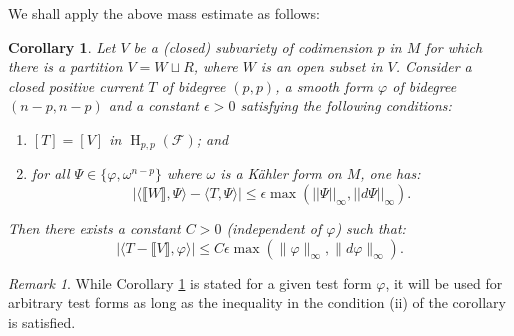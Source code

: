 \documentclass[12pt]{amsbook}%
\newtheorem{cor}[thm]{Corollary}
\theoremstyle{definition}
\theoremstyle{remark}
\newtheorem{rem}[thm]{Remark}
\numberwithin{section}{chapter}
\numberwithin{subsection}{section}
\numberwithin{figure}{chapter}
\DeclareMathOperator{\coh}{H}
\def\kap{}
\begin{document}
{{We shall apply  the above mass estimate as follows:
 
\begin{cor} \label{cor_difference_current}
Let $V$ be a (closed) subvariety of codimension $p$ in $M$ for which there is a partition $V = W\sqcup R$, 
where $W$ is an open subset in $V$. Consider a closed positive current $T$ of bidegree $(p,p)$, a smooth form $\varphi$ of bidegree $(n-p,n-p)$ and a constant $\epsilon>0$  satisfying the following conditions:
\begin{enumerate}
\item[(i)] $[T] = [V]$ in $\coh_{p,p}(\mathcal{F})$; and 
\item[(ii)] 
 for all $\Psi  \in \{ \varphi , \omega^{n-p}\}$  where $\omega$ is a K\"ahler form on $M$, one has: 
$$ \left | \langle \llbracket W\rrbracket, \Psi \rangle - \langle T, \Psi \rangle \right | \leqslant  \epsilon \max (||\Psi||_\infty, ||d\Psi||_\infty ). $$
\end{enumerate} 
Then there exists a constant $C> 0$ (independent of $\varphi$) such that:
\begin{equation*}
| \langle T -   \llbracket V\rrbracket, \varphi  \rangle | \leqslant C\epsilon \max (\lVert\varphi\rVert_\infty, \lVert d\varphi\rVert_\infty ). 
\end{equation*}
\end{cor} 


\begin{rem} While Corollary \ref{cor_difference_current} is stated for a given test form $\varphi$, it will be used for arbitrary test forms as long as the inequality in the condition (ii) of the corollary  is satisfied. 
\end{rem}

}}
\end{document}
